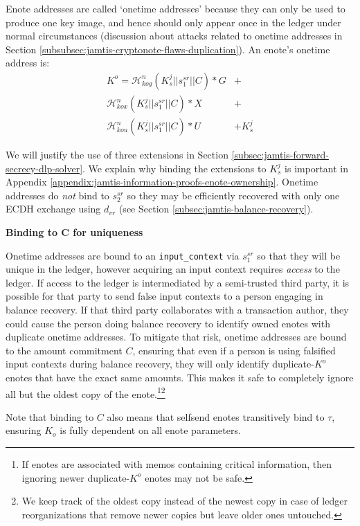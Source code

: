 Enote addresses are called `onetime addresses' because they can only be used to produce one key image, and hence should only appear once in the ledger under normal circumstances (discussion about attacks related to onetime addresses in Section \ref{subsubsec:jamtis-cryptonote-flaws-duplication}). An enote's onetime address is:\vspace{.115cm}
\begin{align*}
    K^o = \mathcal{H}^n_{kog}(K^j_s || s^{sr}_1 || C)*G &+ \\
    \mathcal{H}^n_{kox}(K^j_s || s^{sr}_1 || C)*X &+ \\
    \mathcal{H}^n_{kou}(K^j_s || s^{sr}_1 || C)*U &+ K^j_s
\end{align*}

We will justify the use of three extensions in Section \ref{subsec:jamtis-forward-secrecy-dlp-solver}. We explain why binding the extensions to $K^j_s$ is important in Appendix \ref{appendix:jamtis-information-proofs-enote-ownership}. Onetime addresses do {\em not} bind to $s^{sr}_2$ so they may be efficiently recovered with only one ECDH exchange using $d_{vr}$ (see Section \ref{subsec:jamtis-balance-recovery}).

\textbf{Binding to C for uniqueness}

Onetime addresses are bound to an {\tt input\_context} via $s^{sr}_1$ so that they will be unique in the ledger, however acquiring an input context requires {\em access} to the ledger. If access to the ledger is intermediated by a semi-trusted third party, it is possible for that party to send false input contexts to a person engaging in balance recovery. If that third party collaborates with a transaction author, they could cause the person doing balance recovery to identify owned enotes with duplicate onetime addresses. To mitigate that risk, onetime addresses are bound to the amount commitment $C$, ensuring that even if a person is using falsified input contexts during balance recovery, they will only identify duplicate-$K^o$ enotes that have the exact same amounts. This makes it safe to completely ignore all but the oldest copy of the enote.\footnote{If enotes are associated with memos containing critical information, then ignoring newer duplicate-$K^o$ enotes may not be safe.}\footnote{We keep track of the oldest copy instead of the newest copy in case of ledger reorganizations that remove newer copies but leave older ones untouched.}

Note that binding to $C$ also means that selfsend enotes transitively bind to $\tau$, ensuring $K_o$ is fully dependent on all enote parameters.

